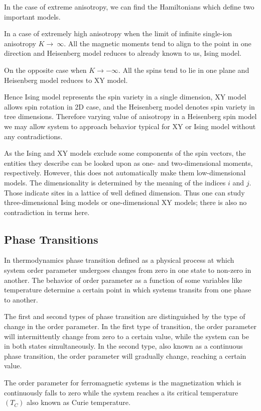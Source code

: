 In the case of extreme anisotropy,  we can find the Hamiltonians which define two important models.

In a case of extremely high anisotropy when the limit of infinite single-ion anisotropy $K\rightarrow~\infty$. All the magnetic moments tend to align to the point in one direction and Heisenberg model reduces to already known to us, Ising model.

On the opposite case when $K \rightarrow -\infty$.  All the spins tend to lie in one plane and Heisenberg model reduces to XY model. 

Hence Ising model represents the spin variety in a single dimension, XY model allows spin rotation in 2D case, and the Heisenberg model denotes spin variety in tree dimensions. Therefore varying value of anisotropy in a Heisenberg spin model we may allow system to approach behavior typical for XY or Ising model without any contradictions.

As the Ising and XY models exclude some components of the spin vectors, the entities they describe can be looked upon as one- and two-dimensional moments, respectively.
However, this does not automatically make them low-dimensional models. The dimensionality is determined by the meaning of the indices $i$ and $j$. Those indicate sites in a lattice of well defined dimension.
Thus one can study three-dimensional Ising models or one-dimensional XY models; there is also no contradiction in terms here.


\subsection{Phase Transitions }
In thermodynamics phase transition defined as a physical process at which system order parameter undergoes changes from zero in one state to non-zero in another. The behavior of order parameter as a function of some variables like temperature determine a certain point in which systems transits from one phase to another.

The first and second types of phase transition are distinguished by the type of change in the order parameter. In the first type of transition, the order parameter will intermittently change from zero to a certain value, while the system can be in both states simultaneously. In the second type, also known as a continuous phase transition, the order parameter will gradually change, reaching a certain value.

The order parameter for ferromagnetic systems is the magnetization which is continuously falls to zero while the system reaches a its critical temperature $(T_C)$ also known as Curie temperature.

